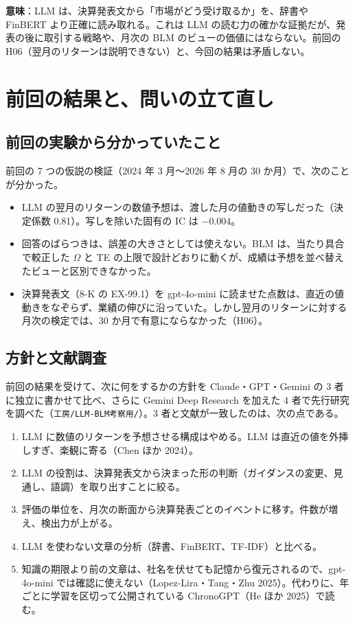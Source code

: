 \documentclass[xelatex,ja=standard,jafont=haranoaji,a4paper,10pt,openany]{bxjsreport}
\newcommand{\code}[1]{\texttt{#1}}
\begin{document}
\textbf{意味}：LLM は、決算発表文から「市場がどう受け取るか」を、辞書や FinBERT より正確に読み取れる。これは LLM の読む力の確かな証拠だが、発表の後に取引する戦略や、月次の BLM のビューの価値にはならない。前回の H06（翌月のリターンは説明できない）と、今回の結果は矛盾しない。

\setcounter{tocdepth}{1}
{\small\tableofcontents}

\chapter{前回の結果と、問いの立て直し}\label{ch:intro}

\section{前回の実験から分かっていたこと}

前回の 7 つの仮説の検証（2024 年 3 月〜2026 年 8 月の 30 か月）で、次のことが分かった。

\begin{itemize}
\item LLM の翌月のリターンの数値予想は、渡した月の値動きの写しだった（決定係数 0.81）。写しを除いた固有の IC は $-0.004$。
\item 回答のばらつきは、誤差の大きさとしては使えない。BLM は、当たり具合で較正した $\Omega$ と TE の上限で設計どおりに動くが、成績は予想を並べ替えたビューと区別できなかった。
\item 決算発表文（8-K の EX-99.1）を gpt-4o-mini に読ませた点数は、直近の値動きをなぞらず、業績の伸びに沿っていた。しかし翌月のリターンに対する月次の検定では、30 か月で有意にならなかった（H06）。
\end{itemize}

\section{方針と文献調査}

前回の結果を受けて、次に何をするかの方針を Claude・GPT・Gemini の 3 者に独立に書かせて比べ、さらに Gemini Deep Research を加えた 4 者で先行研究を調べた（\code{工房/LLM-BLM考察用/}）。3 者と文献が一致したのは、次の点である。

\begin{enumerate}
\item LLM に数値のリターンを予想させる構成はやめる。LLM は直近の値を外挿しすぎ、楽観に寄る（Chen ほか 2024）。
\item LLM の役割は、決算発表文から決まった形の判断（ガイダンスの変更、見通し、語調）を取り出すことに絞る。
\item 評価の単位を、月次の断面から決算発表ごとのイベントに移す。件数が増え、検出力が上がる。
\item LLM を使わない文章の分析（辞書、FinBERT、TF-IDF）と比べる。
\item 知識の期限より前の文章は、社名を伏せても記憶から復元されるので、gpt-4o-mini では確認に使えない（Lopez-Lira・Tang・Zhu 2025）。代わりに、年ごとに学習を区切って公開されている ChronoGPT（He ほか 2025）で読む。
\end{enumerate}
\end{document}
